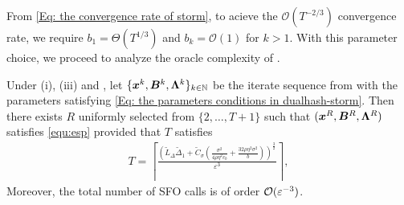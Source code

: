 From \eqref{Eq: the convergence rate of storm},  to acieve the $\mathcal{O}(T^{-2/3})$ convergence rate, we require
$b_{1}= \Theta(T^{1/3})$ and $b_{k}= \mathcal{O}(1)$ for $k > 1$. With this parameter choice, we proceed to analyze the oracle complexity of .
\begin{theorem}
\label{Theorem: the oracle complexity in STORM}
Under (i), (iii) and , let \(\{\bm{x}^k, \bm{B}^k, \bm{\Lambda}^k\}_{k \in \mathbb{N}}\) be the iterate sequence from  with the parameters satisfying \eqref{Eq: the parameters conditions in dualhash-storm}. Then there exists $R$ uniformly selected from $\{2,\dots,T+1\}$ such that \( (\bm{x}^R, \bm{B}^R, \bm{\Lambda}^R )\) satisfies \eqref{equ:esp} provided that  \(T\)  satisfies
\begin{align}
    \label{Eq: the iterate number upper bound of algorithm VR}
        T = \left\lceil \frac{\left(\tilde{L}_{\Delta} \tilde{\Delta}_1+ \tilde{C}_{\sigma}\left( \frac{\sigma^2}{ 4\rho \eta^2 c_b} + \frac{32\rho\eta^2\sigma^2}{b} \right)\right)^{\frac{3}{2}}}{\varepsilon^3} \right\rceil,
\end{align}
Moreover, the total number of SFO calls is of order \(\mathcal{O}(\varepsilon^{-3})\). 
\end{theorem} 

